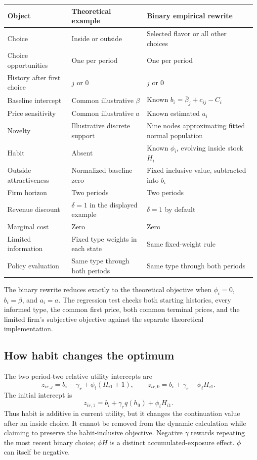 \documentclass[11pt]{article}
\begin{document}
\begin{longtable}{p{}p{}p{}}\toprule
Object & Theoretical example & Binary empirical rewrite\\\midrule\endhead
Choice & Inside or outside & Selected flavor or all other choices\\
Choice opportunities & One per period & One per period\\
History after first choice & $j$ or $0$ & $j$ or $0$\\
Baseline intercept & Common illustrative $\beta$ & Known $b_i=\bar\beta_j+c_{ij}-C_i$\\
Price sensitivity & Common illustrative $a$ & Known estimated $a_i$\\
Novelty & Illustrative discrete support & Nine nodes approximating fitted normal population\\
Habit & Absent & Known $\phi_i$, evolving inside stock $H_i$\\
Outside attractiveness & Normalized baseline zero & Fixed inclusive value, subtracted into $b_i$\\
Firm horizon & Two periods & Two periods\\
Revenue discount & $\delta=1$ in the displayed example & $\delta=1$ by default\\
Marginal cost & Zero & Zero\\
Limited information & Fixed type weights in each state & Same fixed-weight rule\\
Policy evaluation & Same type through both periods & Same type through both periods\\\bottomrule
\end{longtable}

The binary rewrite reduces exactly to the theoretical objective when $\phi_i=0$, $b_i=\beta$, and $a_i=a$. The regression test checks both starting histories, every informed type, the common first price, both common terminal prices, and the limited firm's subjective objective against the separate theoretical implementation.

\subsection{How habit changes the optimum}
The two period-two relative utility intercepts are
\begin{equation}\label{eq:z2}
 z_{ir,j}=b_i-\gamma_r+\phi_i(H_{i1}+1),\qquad
 z_{ir,0}=b_i+\gamma_r+\phi_i H_{i1}.
\end{equation}
The initial intercept is
\begin{equation}\label{eq:z1}
 z_{ir,1}=b_i+\gamma_r q(h_0)+\phi_i H_{i1}.
\end{equation}
Thus habit is additive in current utility, but it changes the continuation value after an inside choice. It cannot be removed from the dynamic calculation while claiming to preserve the habit-inclusive objective. Negative $\gamma$ rewards repeating the most recent binary choice; $\phi H$ is a distinct accumulated-exposure effect. $\phi$ can itself be negative.
\end{document}
